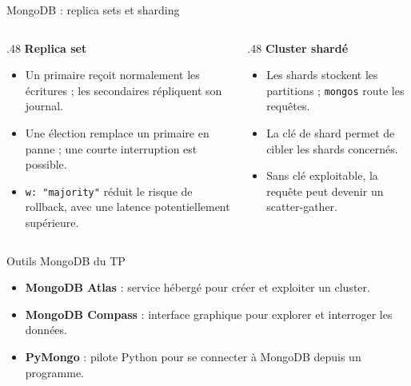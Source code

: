 \begin{frame}{MongoDB : replica sets et sharding}
    \begin{columns}[T,onlytextwidth]
        \begin{column}{.48\textwidth}
            \textbf{Replica set}
            \begin{itemize}
                \item Un primaire reçoit normalement les écritures ; les
                      secondaires répliquent son journal.
                \item Une élection remplace un primaire en panne ; une courte
                      interruption est possible.
                \item \texttt{w: "majority"} réduit le risque de rollback, avec
                      une latence potentiellement supérieure.
            \end{itemize}
        \end{column}
        \begin{column}{.48\textwidth}
            \textbf{Cluster shardé}
            \begin{itemize}
                \item Les shards stockent les partitions ; \texttt{mongos} route
                      les requêtes.
                \item La clé de shard permet de cibler les shards concernés.
                \item Sans clé exploitable, la requête peut devenir un
                      scatter-gather.
            \end{itemize}
        \end{column}
    \end{columns}
\end{frame}

\begin{frame}{Outils MongoDB du TP}
    \begin{itemize}
        \item \textbf{MongoDB Atlas} : service hébergé pour créer et exploiter
              un cluster.
        \item \textbf{MongoDB Compass} : interface graphique pour explorer et
              interroger les données.
        \item \textbf{PyMongo} : pilote Python pour se connecter à MongoDB
              depuis un programme.
    \end{itemize}
\end{frame}

